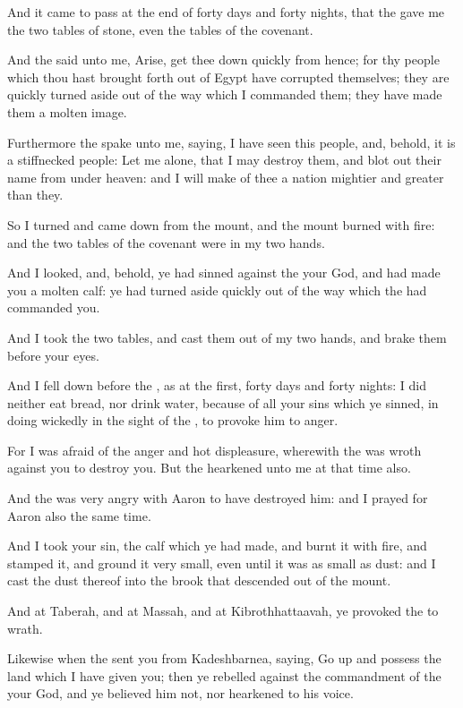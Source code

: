 \Verse And it came to pass at the end of forty days and forty nights, that the \LORD gave me the two tables of stone, even the tables of the covenant.

\Verse And the \LORD said unto me, Arise, get thee down quickly from hence; for thy people which thou hast brought forth out of Egypt have corrupted themselves; they are quickly turned aside out of the way which I commanded them; they have made them a molten image.

\Verse Furthermore the \LORD spake unto me, saying, I have seen this people, and, behold, it is a stiffnecked people: \Verse Let me alone, that I may destroy them, and blot out their name from under heaven: and I will make of thee a nation mightier and greater than they.

\Verse So I turned and came down from the mount, and the mount burned with fire: and the two tables of the covenant were in my two hands.

\Verse And I looked, and, behold, ye had sinned against the \LORD your God, and had made you a molten calf: ye had turned aside quickly out of the way which the \LORD had commanded you.

\Verse And I took the two tables, and cast them out of my two hands, and brake them before your eyes.

\Verse And I fell down before the \LORD, as at the first, forty days and forty nights: I did neither eat bread, nor drink water, because of all your sins which ye sinned, in doing wickedly in the sight of the \LORD, to provoke him to anger.

\Verse For I was afraid of the anger and hot displeasure, wherewith the \LORD was wroth against you to destroy you. But the \LORD hearkened unto me at that time also.

\Verse And the \LORD was very angry with Aaron to have destroyed him: and I prayed for Aaron also the same time.

\Verse And I took your sin, the calf which ye had made, and burnt it with fire, and stamped it, and ground it very small, even until it was as small as dust: and I cast the dust thereof into the brook that descended out of the mount.

\Verse And at Taberah, and at Massah, and at Kibrothhattaavah, ye provoked the \LORD to wrath.

\Verse Likewise when the \LORD sent you from Kadeshbarnea, saying, Go up and possess the land which I have given you; then ye rebelled against the commandment of the \LORD your God, and ye believed him not, nor hearkened to his voice.

